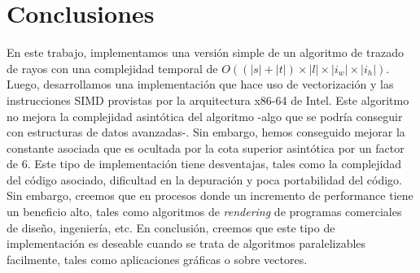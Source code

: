 \section{Conclusiones}


En este trabajo, implementamos una versión simple de un algoritmo de trazado de rayos con una complejidad temporal de $O((|s|+|t|) \times |l| \times |i_w| \times |i_h|)$. Luego, desarrollamos una implementación que hace uso de vectorización y las instrucciones SIMD provistas por la arquitectura x86-64 de Intel. Este algoritmo no mejora la complejidad asintótica del algoritmo -algo que se podría conseguir con estructuras de datos avanzadas-. Sin embargo, hemos conseguido mejorar la constante asociada que es ocultada por la cota superior asintótica por un factor de 6. Este tipo de implementación tiene desventajas, tales como la complejidad del código asociado, dificultad en la depuración y poca portabilidad del código. Sin embargo, creemos que en procesos donde un incremento de performance tiene un beneficio alto, tales como algoritmos de \emph{rendering} de programas comerciales de diseño, ingeniería, etc.
En conclusión, creemos que este tipo de implementación es deseable cuando se trata de algoritmos paralelizables facilmente, tales como aplicaciones gráficas o sobre vectores.